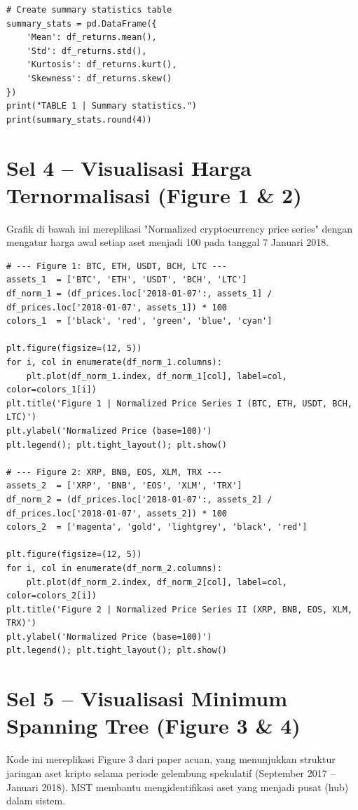 \documentclass[12pt,a4paper]{article}
\begin{document}
\begin{lstlisting}[caption={Kalkulasi statistik deskriptif aset}]
# Create summary statistics table
summary_stats = pd.DataFrame({
    'Mean': df_returns.mean(),
    'Std': df_returns.std(),
    'Kurtosis': df_returns.kurt(),
    'Skewness': df_returns.skew()
})
print("TABLE 1 | Summary statistics.")
print(summary_stats.round(4))
\end{lstlisting}

\section{Sel 4 -- Visualisasi Harga Ternormalisasi (Figure 1 \& 2)}
Grafik di bawah ini mereplikasi "Normalized cryptocurrency price series" dengan mengatur harga awal setiap aset menjadi 100 pada tanggal 7 Januari 2018.

\begin{lstlisting}[caption={Dua set plot harga ternormalisasi}]
# --- Figure 1: BTC, ETH, USDT, BCH, LTC ---
assets_1  = ['BTC', 'ETH', 'USDT', 'BCH', 'LTC']
df_norm_1 = (df_prices.loc['2018-01-07':, assets_1] / df_prices.loc['2018-01-07', assets_1]) * 100
colors_1  = ['black', 'red', 'green', 'blue', 'cyan']

plt.figure(figsize=(12, 5))
for i, col in enumerate(df_norm_1.columns):
    plt.plot(df_norm_1.index, df_norm_1[col], label=col, color=colors_1[i])
plt.title('Figure 1 | Normalized Price Series I (BTC, ETH, USDT, BCH, LTC)')
plt.ylabel('Normalized Price (base=100)')
plt.legend(); plt.tight_layout(); plt.show()

# --- Figure 2: XRP, BNB, EOS, XLM, TRX ---
assets_2  = ['XRP', 'BNB', 'EOS', 'XLM', 'TRX']
df_norm_2 = (df_prices.loc['2018-01-07':, assets_2] / df_prices.loc['2018-01-07', assets_2]) * 100
colors_2  = ['magenta', 'gold', 'lightgrey', 'black', 'red']

plt.figure(figsize=(12, 5))
for i, col in enumerate(df_norm_2.columns):
    plt.plot(df_norm_2.index, df_norm_2[col], label=col, color=colors_2[i])
plt.title('Figure 2 | Normalized Price Series II (XRP, BNB, EOS, XLM, TRX)')
plt.ylabel('Normalized Price (base=100)')
plt.legend(); plt.tight_layout(); plt.show()
\end{lstlisting}

\section{Sel 5 -- Visualisasi Minimum Spanning Tree (Figure 3 \& 4)}
Kode ini mereplikasi Figure 3 dari paper acuan, yang menunjukkan struktur jaringan aset kripto selama periode gelembung spekulatif (September 2017 -- Januari 2018). MST membantu mengidentifikasi aset yang menjadi pusat (hub) dalam sistem.
\end{document}
